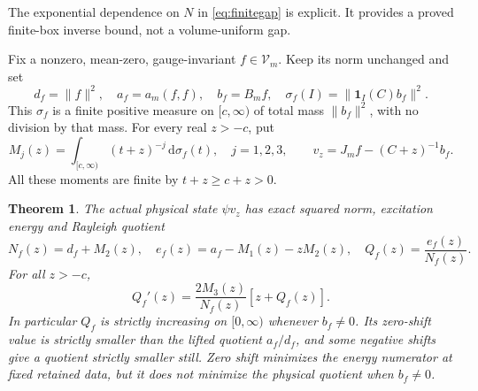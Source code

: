 \documentclass[11pt]{article}
\newtheorem{theorem}{Theorem}[section]
\newcommand{\dd}{\,\mathrm d}
\newcommand{\VV}{\mathscr V}
\begin{document}
The exponential dependence on $N$ in \eqref{eq:finitegap} is explicit.
It provides a proved finite-box inverse bound, not a volume-uniform gap.

Fix a nonzero, mean-zero, gauge-invariant $f\in\VV_m$. Keep its norm
unchanged and set
\[
 d_f=\|f\|^2,\quad a_f=a_m(f,f),\quad b_f=B_mf,\quad
 \sigma_f(I)=\|\mathbf1_I(C)b_f\|^2 .
\]
This $\sigma_f$ is a finite positive measure on $[c,\infty)$ of total
mass $\|b_f\|^2$, with no division by that mass. For every real $z>-c$,
put
\begin{equation}\label{eq:inversemoments}
 M_j(z)=\int_{[c,\infty)}(t+z)^{-j}\dd\sigma_f(t),\quad j=1,2,3,
 \qquad v_z=J_mf-(C+z)^{-1}b_f .
\end{equation}
All these moments are finite by $t+z\geq c+z>0$.

\begin{theorem}\label{thm:affine}
The actual physical state $\psi v_z$ has exact squared norm, excitation
energy and Rayleigh quotient
\begin{equation}\label{eq:affinemoments}
 N_f(z)=d_f+M_2(z),\quad
 e_f(z)=a_f-M_1(z)-zM_2(z),\quad
 Q_f(z)=\frac{e_f(z)}{N_f(z)}.
\end{equation}
For all $z>-c$,
\begin{equation}\label{eq:rayleighderivative}
 Q_f'(z)=\frac{2M_3(z)}{N_f(z)}[z+Q_f(z)].
\end{equation}
In particular $Q_f$ is strictly increasing on $[0,\infty)$ whenever
$b_f\ne0$. Its zero-shift value is strictly smaller than the lifted
quotient $a_f/d_f$, and some negative shifts give a quotient strictly
smaller still. Zero shift minimizes the energy numerator at fixed
retained data, but it does not minimize the physical quotient when
$b_f\ne0$.


\end{theorem}
\end{document}
